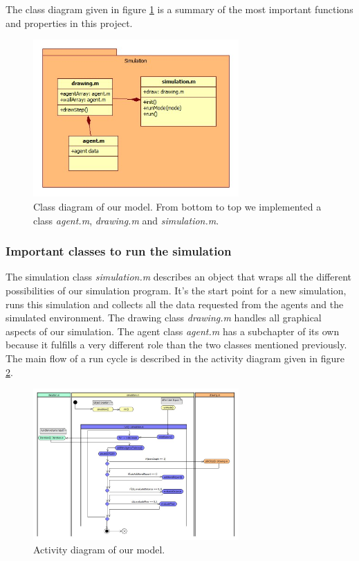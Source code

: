 \noi The class diagram given in figure \ref{fig:classpackage} is a summary of the most important functions and properties in this project.\\
\begin{figure}[h!]
	\centering
		\includegraphics[width=0.70\textwidth]{pictures/classpackage}
	\caption{Class diagram of our model. From bottom to top we implemented a class \textit{agent.m}, \textit{drawing.m} and \textit{simulation.m}.}
	\label{fig:classpackage}
\end{figure}

\subsubsection{Important classes to run the simulation}
\noi The simulation class \textit{simulation.m} describes an object that wraps all the different possibilities of our simulation program. It's the start point for a new simulation, runs this simulation and collects all the data requested from the agents and the simulated environment. The drawing class \textit{drawing.m} handles all graphical aspects of our simulation. The agent class \textit{agent.m} has a subchapter of its own because it fulfills a very different role than the two classes mentioned previously.\\
The main flow of a run cycle is described in the activity diagram given in figure \ref{fig:activityDiagram}.\\
\begin{figure}[h!]
	\centering
		\includegraphics[width=0.70\textwidth]{pictures/activityDiagram}
	\caption{Activity diagram of our model.}
	\label{fig:activityDiagram}
\end{figure}

